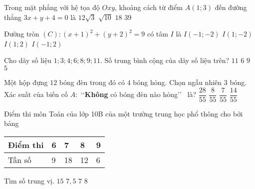 \begin{ex}%
	Trong mặt phẳng với hệ tọa độ $Oxy$, khoảng cách từ điểm $A(1 ; 3)$ đến đường thẳng $3 x+y+4=0$ là
	\choice
	{$12 \sqrt{3}$}
	{\True $\sqrt{10}$}
	{$ 18  $}
	{$ 39  $}
\end{ex}

\begin{ex}%
	Đường tròn $(C)\colon (x+1)^2+(y+2)^2=9$ có tâm $I$ là
	\choice
	{\True $I(-1 ;-2)$}
	{$I(1 ;-2)$}
	{$I(1 ; 2)$}
	{$I(-1 ; 2)$}
\end{ex}

\begin{ex}%
	Cho dãy số liệu $1 ; 3 ; 4 ; 6 ; 8 ; 9 ; 11$. Số trung bình cộng của dãy số liệu trên? 
	\choice
	{$ 11  $}
	{\True $ 6 $ }
	{$ 9  $}
	{$ 5  $}
\end{ex}

\begin{ex}%
	Một hộp đựng $ 12 $ bóng đèn trong đó có $ 4 $ bóng hỏng. Chọn ngẫu nhiên $ 3 $ bóng. Xác suất của biến cố $A\colon$   \lq\lq \textbf{Không} có bóng đèn nào hỏng\rq\rq~ là?
	\choice
	{$\dfrac{28}{55}$}
	{$\dfrac{8}{55}$}
	{$\dfrac{7}{55}$}
	{\True $\dfrac{14}{55}$}
\end{ex}

\begin{ex}%
	Điểm thi môn Toán của lớp 10B của một trường trung học phổ thông cho bởi bảng
	\begin{center}
	\begin{tabular}{|l|l|l|l|l|}
		\hline Điểm thi & 6 & 7 & 8 & 9 \\
		\hline Tần số & 9 & 18 & 12 & 6 \\
		\hline
	\end{tabular} \end{center}
	Tìm số trung vị.
	\choice
	{$ 15  $}
	{$ 7,5  $}
	{\True $ 7  $}
	{$ 8  $}
\end{ex}

